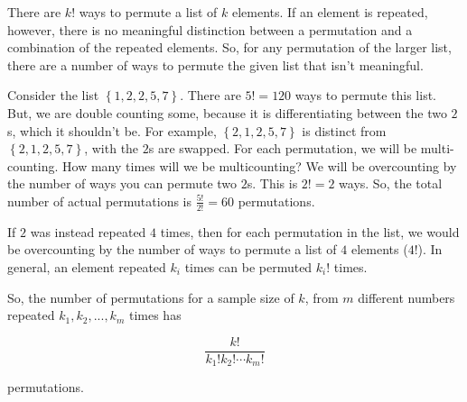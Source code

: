{There are $k!$ ways to permute a list of $k$ elements. If an element is repeated,
however, there is no meaningful distinction between a permutation and a combination
of the repeated elements. So, for any permutation of the larger list, there are a
number of ways to permute the given list that isn't meaningful.

Consider the list $\left \{ 1, 2, 2, 5, 7 \right \}$. There are $5! = 120$ ways
to permute this list. But, we are double counting some, because it is differentiating
between the two $2$s, which it shouldn't be. For example,
$\left \{ 2, 1, 2, 5, 7 \right \}$ is distinct from
$\left \{ 2, 1, 2, 5, 7 \right \}$, with the $2$s are swapped. For each permutation,
we will be multi-counting. How many times will we be multicounting? We will be
overcounting by the number of ways you can permute two $2$s. This is $2! = 2$ ways.
So, the total number of actual permutations is $\frac{5!}{2!} = 60$ permutations.

If $2$ was instead repeated $4$ times, then for each permutation in the list, we
would be overcounting by the number of ways to permute a list of $4$ elements
($4!$). In general, an element repeated $k_i$ times can be permuted $k_i!$ times.

So, the number of permutations for a sample size of $k$, from $m$ different
numbers repeated $k_1, k_2, ..., k_m$ times has

$$\frac{k!}{k_1!k_2!\cdots k_m!}$$

permutations.

}

\exerciseshere
